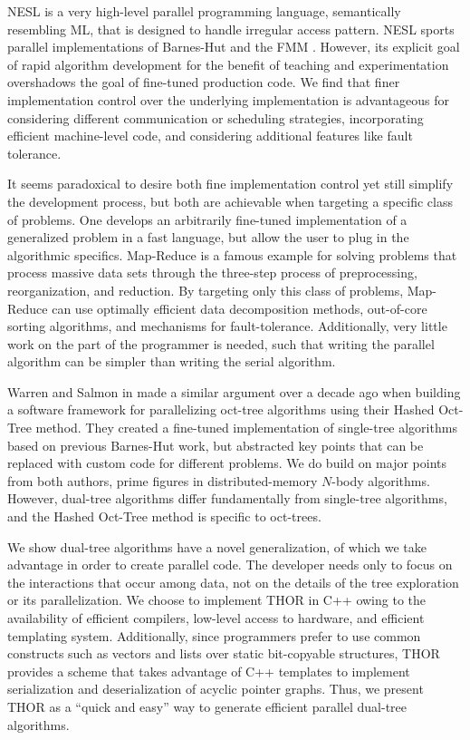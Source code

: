 \documentclass[twoside,leqno,twocolumn]{article}
\begin{document}
NESL is a very high-level parallel programming language, semantically resembling ML, that is designed to handle irregular access pattern.
NESL sports parallel implementations of Barnes-Hut and the FMM \cite{blelloch_nbody}.
However, its explicit goal of rapid algorithm development for the benefit of teaching and experimentation overshadows the goal of fine-tuned production code.
We find that finer implementation control over the underlying implementation is advantageous for considering different communication or scheduling strategies, incorporating efficient machine-level code, and considering additional features like fault tolerance.

It seems paradoxical to desire both fine implementation control yet still simplify the development process, but both are achievable when targeting a specific class of problems.
One develops an arbitrarily fine-tuned implementation of a generalized problem in a fast language, but allow the user to plug in the algorithmic specifics.
Map-Reduce \cite{mapreduce} is a famous example for solving problems that process massive data sets through the three-step process of preprocessing, reorganization, and reduction.
By targeting only this class of problems, Map-Reduce can use optimally efficient data decomposition methods, out-of-core sorting algorithms, and mechanisms for fault-tolerance.
Additionally, very little work on the part of the programmer is needed, such that writing the parallel algorithm can be simpler than writing the serial algorithm.

Warren and Salmon in \cite{warren95portable} made a similar argument over a decade ago when building a software framework for parallelizing oct-tree algorithms using their Hashed Oct-Tree method.
They created a fine-tuned implementation of single-tree algorithms based on previous Barnes-Hut work, but abstracted key points that can be replaced with custom code for different problems.
We do build on major points from both authors, prime figures in distributed-memory $N$-body algorithms.
However, dual-tree algorithms differ fundamentally from single-tree algorithms, and the Hashed Oct-Tree method is specific to oct-trees.

We show dual-tree algorithms have a novel generalization, of which we take advantage in order to create parallel code.
The developer needs only to focus on the interactions that occur among data, not on the details of the tree exploration or its parallelization.
We choose to implement THOR in C++ owing to the availability of efficient compilers, low-level access to hardware, and efficient templating system.
Additionally, since programmers prefer to use common constructs such as vectors and lists over static bit-copyable structures, THOR provides a scheme that takes advantage of C++ templates to implement serialization and deserialization of acyclic pointer graphs.
Thus, we present THOR as a ``quick and easy'' way to generate efficient parallel dual-tree algorithms.
\end{document}
